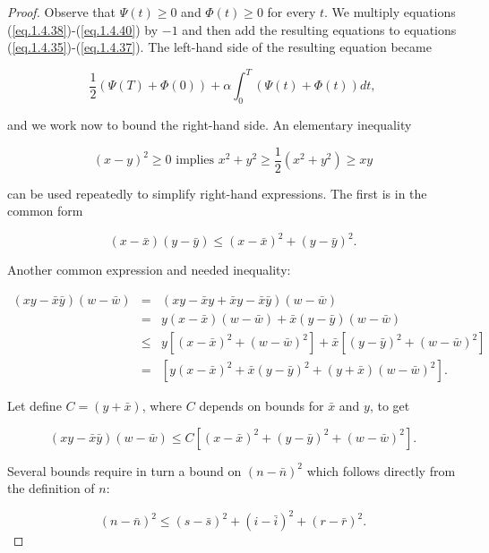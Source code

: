 \begin{proof}
Observe that $\Psi(t)\geq 0$ and $\Phi(t)\geq 0$ for every $t$. We multiply equations (\ref{eq.1.4.38})-(\ref{eq.1.4.40}) by $-1$ and then add the resulting equations to equations (\ref{eq.1.4.35})-(\ref{eq.1.4.37}). The left-hand side of the resulting equation became

\begin{equation*}
	\frac{1}{2}(\Psi(T)+\Phi(0))+\alpha\int_{0}^{T}(\Psi(t)+\Phi(t))dt,
\end{equation*}

and we work now to bound the right-hand side. An elementary inequality

\begin{equation*}
(x-y)^2\geq 0\,\,\mbox{implies}\,\, x^2+y^2\geq \frac{1}{2}(x^2+y^2)\geq xy
\end{equation*}

can be used repeatedly to simplify right-hand expressions. The first is in the common form

\begin{equation}\label{eq.1.4.41}
(x-\bar{x})(y-\bar{y})\leq (x-\bar{x})^2+(y-\bar{y})^2.
\end{equation}

Another common expression and needed inequality:

\begin{eqnarray*}
(xy-\bar{x}\bar{y})(w-\bar{w})&=& (xy-\bar{x}y+\bar{x}y-\bar{x}\bar{y})(w-\bar{w})\\
&=& y(x-\bar{x})(w-\bar{w})+\bar{x}(y-\bar{y})(w-\bar{w})\\
&\leq&y[(x-\bar{x})^2+(w-\bar{w})^2]+\bar{x}[(y-\bar{y})^2+(w-\bar{w})^2]\\
&=& [y(x-\bar{x})^2+\bar{x}(y-\bar{y})^2+(y+\bar{x})(w-\bar{w})^2].
\end{eqnarray*}

Let define $C=(y+\bar{x})$, where $C$ depends on bounds for $\bar{x}$ and $y$, to get

\begin{equation}\label{eq.1.4.42}
(xy-\bar{x}\bar{y})(w-\bar{w})\leq C[(x-\bar{x})^2+(y-\bar{y})^2+(w-\bar{w})^2].
\end{equation}

Several bounds require in turn a bound on $(n-\bar{n})^2$ which follows directly from the definition of $n$:

\begin{equation}\label{eq.1.4.43}
(n-\bar{n})^2\leq (s-\bar{s})^2+(i-\bar{i})^2+(r-\bar{r})^2.
\end{equation}


\end{proof}
